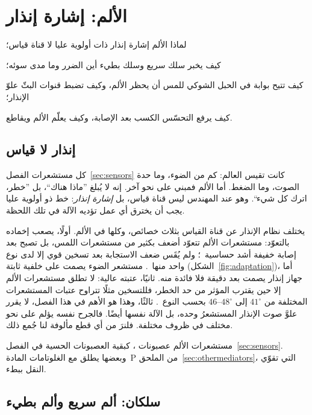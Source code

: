 \chapter{الألم: إشارة إنذار}
\label{sec:pain}
\begin{chaptergoals}
\item لماذا الألم إشارة إنذار ذات أولوية عليا لا قناة قياس؛
\item كيف يخبر سلك سريع وسلك بطيء أين الضرر وما مدى سوئه؛
\item كيف تتيح بوابة في الحبل الشوكي للمس أن يحظر الألم، وكيف تضبط قنوات البثّ علوّ الإنذار؛
\item كيف يرفع التحسّس الكسب بعد الإصابة، وكيف يعلّم الألم ويقاطع.
\end{chaptergoals}

\section{إنذار لا قياس}

كل مستشعرات الفصل~\ref{sec:sensors} كانت تقيس العالم: كم من الضوء، وما حدة الصوت، وما الضغط. أما الألم فمبني على نحو آخر. إنه لا يُبلغ ”ماذا هناك“، بل ”خطر، اترك كل شيء“. وهو عند المهندس ليس قناة قياس، بل \emph{إشارة إنذار}: خط ذو أولوية عليا يجب أن يخترق أي عمل تؤديه الآلة في تلك اللحظة.

يختلف نظام الإنذار عن قناة القياس بثلاث خصائص، وكلها في الألم. أولًا، يصعب إخماده بالتعوّد: مستشعرات الألم تتعوّد أضعف بكثير من مستشعرات اللمس، بل تصبح بعد إصابة خفيفة أشد حساسية~\cite{LaMotte1982hyper}؛ ولم يُقَس ضعف الاستجابة بعد تسخين قوي إلا لدى نوع واحد منها~\cite{Treede1995heat}. مستشعر الضوء يصمت على خلفية ثابتة (الشكل~\ref{fig:adaptation})، أما جهاز إنذار يصمت بعد دقيقة فلا فائدة منه. ثانيًا، عتبته عالية: لا تطلق مستشعرات الألم إلا حين يقترب المؤثر من حد الخطر، فللتسخين مثلًا تتراوح عتبات المستشعرات المختلفة من $41^\circ$ إلى $46\text{--}48^\circ$ بحسب النوع~\cite{Treede1995heat, Weidner1999cfib}. ثالثًا، وهذا هو الأهم في هذا الفصل، لا يقرر علوَّ صوت الإنذار المستشعرُ وحده، بل الآلة نفسها أيضًا. فالجرح نفسه يؤلم على نحو مختلف في ظروف مختلفة. فلنرَ من أي قطع مألوفة لنا جُمع ذلك.

مستشعرات الألم عصبونات ، كبقية العصبونات الحسية في الفصل~\ref{sec:sensors}. وبعضها يطلق مع الغلوتامات المادة~\foreignlanguage{english}{P} من الملحق~\ref{sec:othermediators}، التي تقوّي النقل ببطء.

\section{سلكان: ألم سريع وألم بطيء}

